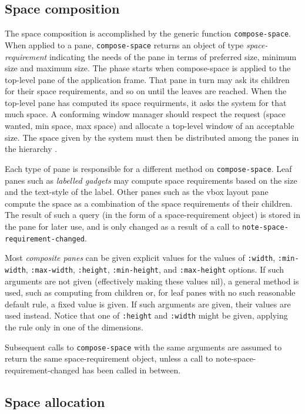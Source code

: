 \subsection{Space composition}

The space composition is accomplished by the generic function
\texttt{compose-space}.  When applied to a pane, \texttt{compose-space}
returns an object of type \emph{space-requirement} indicating the needs
of the pane in terms of preferred size, minimum size and maximum size.
The phase starts when compose-space is applied to the top-level pane of
the application frame.  That pane in turn may ask its children for their
space requirements, and so on until the leaves are reached.  When the
top-level pane has computed its space requirments, it asks the system
for that much space.  A conforming window manager should respect the
request (space wanted, min space, max space) and allocate a top-level
window of an acceptable size.  The space given by the system must then
be distributed among the panes in the hierarchy
.

Each type of pane is responsible for a different method on
\texttt{compose-space}.  Leaf panes such as \emph{labelled gadgets} may
compute space requirements based on the size and the text-style of the
label.  Other panes such as the vbox layout pane compute the space as a
combination of the space requirements of their children.  The result of
such a query (in the form of a space-requirement object) is stored in
the pane for later use, and is only changed as a result of a call to
\texttt{note-space-requirement-changed}.

Most \emph{composite panes} can be given explicit values for the values
of \texttt{:width}, \texttt{:min-width}, \texttt{:max-width},
\texttt{:height}, \texttt{:min-height}, and \texttt{:max-height}
options.  If such arguments are not given (effectively making these
values nil), a general method is used, such as computing from children
or, for leaf panes with no such reasonable default rule, a fixed value
is given.  If such arguments are given, their values are used instead.
Notice that one of \texttt{:height} and \texttt{:width} might be
given, applying the rule only in one of the dimensions.

Subsequent calls to \texttt{compose-space} with the same arguments are
assumed to return the same space-requirement object, unless a call to
note-space-requirement-changed has been called in between.

\subsection{Space allocation}
\label{space-allocation}

